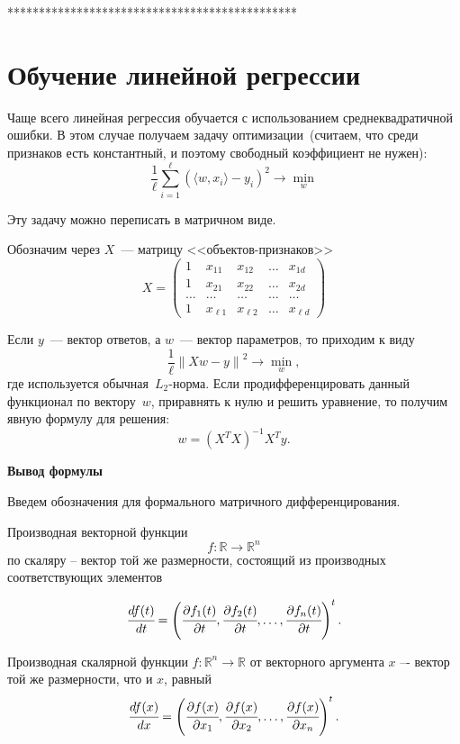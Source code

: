 \documentclass[12pt,fleqn]{article}
\begin{document}
\centerline{**********************************************}

\section{Обучение линейной регрессии}

Чаще всего линейная регрессия обучается с использованием среднеквадратичной ошибки.
В этом случае получаем задачу оптимизации~(считаем, что среди признаков есть константный, и поэтому
свободный коэффициент не нужен):
$$
    \frac{1}{\ell}
    \sum_{i = 1}^{\ell} \left(
        \langle w, x_i \rangle - y_i
    \right)^2
    \to
    \min_{w}
$$

Эту задачу можно переписать в матричном виде.

Обозначим через $X$~--- матрицу <<объектов-признаков>>
$$
X=\left(
\begin{matrix}
	1 & x_{11} & x_{12} & \ldots & x_{1d} \\
	1 & x_{21} & x_{22} & \ldots & x_{2d} \\
	\ldots  & \ldots  & \ldots   & \ldots & \ldots  \\
	1 & x_{\ell 1} & x_{\ell 2}  & \ldots & x_{\ell d} 
\end{matrix}
\right)
$$

Если $y$~--- вектор ответов, а $w$~--- вектор параметров,
то приходим к виду
$$
    \frac{1}{\ell}
    \left\|
        Xw - y
    \right\|^2
    \to
    \min_{w},
$$
где используется обычная~$L_2$-норма.
Если продифференцировать данный функционал по вектору~$w$, приравнять к нулю
и решить уравнение, то получим явную формулу для решения:
$$
    w
    =
    (X^T X)^{-1} X^T y.
$$

\textbf{Вывод формулы }

Введем обозначения для формального матричного дифференцирования. 

Производная векторной функции $$f : \mathbb{R} \to  \mathbb{R}^n $$ по скаляру -- вектор той же размерности, состоящий из производных соответствующих элементов 

$$\cfrac{df(t)}{dt} = \left(\cfrac{\partial  f_1(t)}{\partial  t}, \cfrac{\partial  f_2(t)}{\partial  t}, \ldots, \cfrac{\partial  f_n(t)}{\partial  t}  \right)^t.$$

Производная скалярной функции $f: \mathbb{R}^n \to \mathbb{R}$  от векторного аргумента $x$ –- вектор той же размерности, что и $x$, равный 
$$\cfrac{df(x)}{dx}  = \left(\cfrac{\partial  f(x)}{\partial  x_1} , \cfrac{\partial  f(x)}{\partial  x_2}, \ldots, \cfrac{\partial  f (x)}{\partial  x_n} \right)^t.$$
\end{document}

